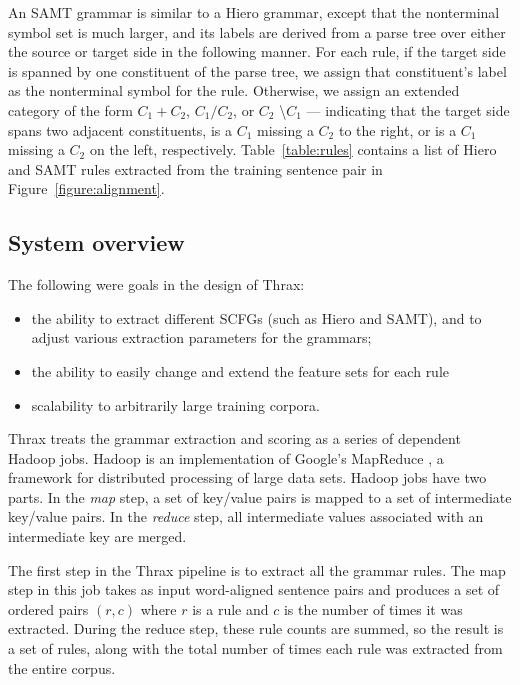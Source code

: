 \documentclass[11pt]{article}
\begin{document}
An SAMT grammar \cite{samt2006} is similar to a Hiero grammar, except
that the nonterminal symbol set is much larger, and its labels are
derived from a parse tree over either the source or target side in the
following manner.  For each rule, if
the target side is spanned by one constituent of the parse tree, we
assign that constituent's label as the nonterminal symbol for the
rule.  Otherwise, we assign an extended category of the form
$C_1+C_2$, $C_1 / C_2$, or $C_2$ \textbackslash $C_1$ --- indicating
that the target side spans two adjacent constituents, is a $C_1$
missing a $C_2$ to the right, or is a $C_1$ missing a $C_2$ on the
left, respectively.  
Table~\ref{table:rules} contains a list of Hiero and SAMT rules
extracted from the training sentence pair in Figure~\ref{figure:alignment}.

\subsection{System overview}
\label{design}

The following were goals in the design of Thrax:

\begin{itemize}
\item the ability to extract different SCFGs (such as Hiero and SAMT), and to adjust various extraction parameters for the grammars;
\item the ability to easily change and extend the feature sets for
  each rule
\item scalability to arbitrarily large training corpora.
\end{itemize}

Thrax treats the grammar extraction and scoring as a series of dependent Hadoop jobs. Hadoop \cite{venugopal2009hadoop} is an implementation of Google's MapReduce \cite{mapreduce}, a framework for distributed processing of large data sets. Hadoop jobs have two parts. In the {\em map} step, a set of key/value pairs is mapped to a set of intermediate key/value pairs. In the {\em reduce} step, all intermediate values associated with an intermediate key are merged.

The first step in the Thrax pipeline is to extract all the grammar rules. The map step in this job takes as input word-aligned sentence pairs and produces a set of ordered pairs $(r,c)$ where $r$ is a rule and $c$ is the number of times it was extracted. During the reduce step, these rule counts are summed, so the result is a set of rules, along with the total number of times each rule was extracted from the entire corpus.
\end{document}
